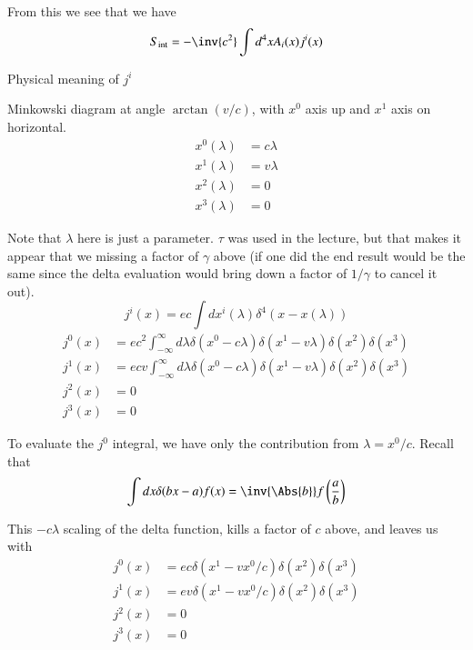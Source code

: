 From this we see that we have
%
\begin{equation}\label{eqn:relativisticElectrodynamicsL12b:430}
S_{\text{int}} = -\inv{c^2} \int d^4 x A_i(x) j^i(x)
\end{equation}

Physical meaning of \(j^i\)

Minkowski diagram at angle \(\arctan(v/c)\), with \(x^0\) axis up and \(x^1\) axis on horizontal.
%
\begin{equation}\label{eqn:relativisticElectrodynamicsL12b:450}
\begin{aligned}
x^0(\lambda) &= c \lambda \\
x^1(\lambda) &= v \lambda \\
x^2(\lambda) &= 0 \\
x^3(\lambda) &= 0
\end{aligned}
\end{equation}

Note that \(\lambda\) here is just a parameter.  \(\tau\) was used in the lecture, but that makes it appear that we missing a factor of \(\gamma\) above (if one did the end result would be the same since the delta evaluation would bring down a factor of \(1/\gamma\) to cancel it out).
%
\begin{equation}\label{eqn:relativisticElectrodynamicsL12b:470}
j^i(x) = e c \int dx^i(\lambda) \delta^4 (x - x(\lambda))
\end{equation}
%
\begin{equation}\label{eqn:relativisticElectrodynamicsL12b:490}
\begin{aligned}
j^0(x) &= e c^2  \int_{-\infty}^\infty d\lambda \delta(x^0 -  c \lambda) \delta(x^1 -  v \lambda) \delta(x^2) \delta(x^3) \\
j^1(x) &= e c v  \int_{-\infty}^\infty d\lambda \delta(x^0 -  c \lambda) \delta(x^1 -  v \lambda) \delta(x^2) \delta(x^3) \\
j^2(x) &= 0 \\
j^3(x) &= 0
\end{aligned}
\end{equation}

To evaluate the \(j^0\) integral, we have only the contribution from \(\lambda = x^0/ c\).  Recall that
%
\begin{equation}\label{eqn:relativisticElectrodynamicsL12b:510}
\int dx \delta( b x - a) f(x) = \inv{\Abs{b}} f\left( \frac{a}{b} \right)
\end{equation}

This \(- c\lambda\) scaling of the delta function, kills a factor of \(c \) above, and leaves us with
%
\begin{equation}\label{eqn:relativisticElectrodynamicsL12b:530}
\begin{aligned}
j^0(x) &= e c \delta(x^1 - v x^0/c) \delta(x^2) \delta(x^3) \\
j^1(x) &= e v \delta(x^1 - v x^0/c) \delta(x^2) \delta(x^3) \\
j^2(x) &= 0 \\
j^3(x) &= 0
\end{aligned}
\end{equation}

